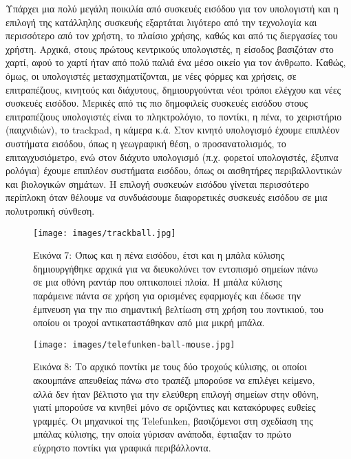 \documentclass[
]{article}
\begin{document}
Υπάρχει μια πολύ μεγάλη ποικιλία από συσκευές εισόδου για τον υπολογιστή
και η επιλογή της κατάλληλης συσκευής εξαρτάται λιγότερο από την
τεχνολογία και περισσότερο από τον χρήστη, το πλαίσιο χρήσης, καθώς και
από τις διεργασίες του χρήστη. Αρχικά, στους πρώτους κεντρικούς
υπολογιστές, η είσοδος βασιζόταν στο χαρτί, αφού το χαρτί ήταν από πολύ
παλιά ένα μέσο οικείο για τον άνθρωπο. Καθώς, όμως, οι υπολογιστές
μετασχηματίζονται, με νέες φόρμες και χρήσεις, σε επιτραπέζιους,
κινητούς και διάχυτους, δημιουργούνται νέοι τρόποι ελέγχου και νέες
συσκευές εισόδου. Μερικές από τις πιο δημοφιλείς συσκευές εισόδου στους
επιτραπέζιους υπολογιστές είναι το πληκτρολόγιο, το ποντίκι, η πένα, το
χειριστήριο (παιχνιδιών), το trackpad, η κάμερα κ.ά. Στον κινητό
υπολογισμό έχουμε επιπλέον συστήματα εισόδου, όπως η γεωγραφική θέση, ο
προσανατολισμός, το επιταγχυσιόμετρο, ενώ στον διάχυτο υπολογισμό (π.χ.
φορετοί υπολογιστές, έξυπνα ρολόγια) έχουμε επιπλέον συστήματα εισόδου,
όπως οι αισθητήρες περιβαλλοντικών και βιολογικών σημάτων. Η επιλογή
συσκευών εισόδου γίνεται περισσότερο περίπλοκη όταν θέλουμε να
συνδυάσουμε διαφορετικές συσκευές εισόδου σε μια πολυτροπική σύνθεση.

\leavevmode{}%
\begin{figure}
\hypertarget{fig:trackball}{%
\centering
\texttt{[image: images/trackball.jpg]}
\caption{Εικόνα 7: Όπως και η πένα εισόδου, έτσι και η μπάλα κύλισης
δημιουργήθηκε αρχικά για να διευκολύνει τον εντοπισμό σημείων πάνω σε
μια οθόνη ραντάρ που οπτικοποιεί πλοία. Η μπάλα κύλισης παράμεινε πάντα
σε χρήση για ορισμένες εφαρμογές και έδωσε την έμπνευση για την πιο
σημαντική βελτίωση στη χρήση του ποντικιού, του οποίου οι τροχοί
αντικαταστάθηκαν από μια μικρή μπάλα.}\label{fig:trackball}
}
\end{figure}

\leavevmode{}%
\begin{figure}
\hypertarget{fig:telefunken-ball-mouse}{%
\centering
\texttt{[image: images/telefunken-ball-mouse.jpg]}
\caption{Εικόνα 8: Το αρχικό ποντίκι με τους δύο τροχούς κύλισης, οι
οποίοι ακουμπάνε απευθείας πάνω στο τραπέζι μπορούσε να επιλέγει
κείμενο, αλλά δεν ήταν βέλτιστο για την ελεύθερη επιλογή σημείων στην
οθόνη, γιατί μπορούσε να κινηθεί μόνο σε οριζόντιες και κατακόρυφες
ευθείες γραμμές. Οι μηχανικοί της Telefunken, βασιζόμενοι στη σχεδίαση
της μπάλας κύλισης, την οποία γύρισαν ανάποδα, έφτιαξαν το πρώτο
εύχρηστο ποντίκι για γραφικά
περιβάλλοντα.}\label{fig:telefunken-ball-mouse}
}
\end{figure}
\end{document}
